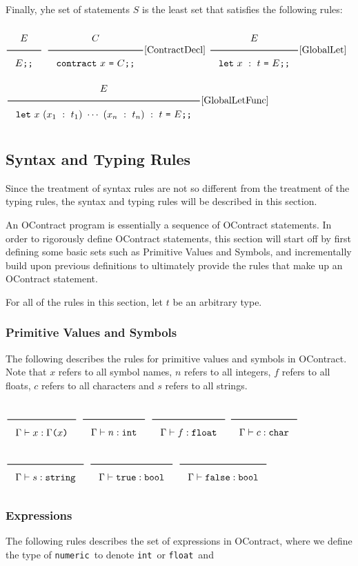 \documentclass[a4paper]{article}
\newcommand{\Rule}[2]{\genfrac{}{}{0.7pt}{}{{\setlength{\fboxrule}{0pt}\setlength{\fboxsep}{3mm}\fbox{$#1$}}}{{\setlength{\fboxrule}{0pt}\setlength{\fboxsep}{3mm}\fbox{$#2$}}}}
\newcommand{\RuleWithName}[3]{\genfrac{}{}{0.7pt}{}{{\setlength{\fboxrule}{0pt}\setlength{\fboxsep}{3mm}\fbox{$#1$}}}{{\setlength{\fboxrule}{0pt}\setlength{\fboxsep}{3mm}\fbox{$#2$}}}[\text{#3}]}
\newcommand{\TruE}{\texttt{true}}
\newcommand{\FalsE}{\texttt{false}}
\newcommand{\Int}{\texttt{int}}
\newcommand{\Float}{\texttt{float}}
\newcommand{\String}{\texttt{string}}
\newcommand{\Char}{\texttt{char}}
\newcommand{\Num}{\texttt{numeric}}
\newcommand{\Bool}{\texttt{bool}}
\newcommand{\Rp}{\texttt{)}}
\newcommand{\Lp}{\texttt{(}}
\begin{document}
Finally, yhe set of statements $S$ is the least set that satisfies the following rules:

$\Rule{E}{E\texttt{;;}}$
\hfill
$\RuleWithName{C}{\texttt{contract}\ x\ \texttt{=}\ C\texttt{;;}}{ContractDecl}$
\hfill
$\RuleWithName{E}{\texttt{let}\ x\ :\ t\ \texttt{=}\ E\texttt{;;}}{GlobalLet}$
\hfill
$\RuleWithName{E}{\texttt{let}\ x\ (x_1\ :\ t_1)\ \cdots\ (x_n\ :\ t_n)\ :\ t\ \texttt{=}\ E\texttt{;;}}{GlobalLetFunc}$


\subsection{Syntax and Typing Rules}
Since the treatment of syntax rules are not so different from the treatment of the typing rules, the syntax and typing rules will be described in this section.

An OContract program is essentially a sequence of OContract statements. In order to rigorously define OContract statements,
this section will start off by first defining some basic sets such as Primitive Values and Symbols, and incrementally build upon
previous definitions to ultimately provide the rules that make up an OContract statement.

For all of the rules in this section, let $t$ be an arbitrary type.

\subsubsection{Primitive Values and Symbols}

The following describes the rules for primitive values and symbols in OContract.
Note that $x$ refers to all symbol names, $n$ refers to all integers, $f$ refers to all floats,
$c$ refers to all characters and $s$ refers to all strings.

$\Rule{}{\Gamma \vdash x : \Gamma \Lp x \Rp}$
\hfill
$\Rule{}{\Gamma \vdash n : \Int}$
\hfill
$\Rule{}{\Gamma \vdash f : \Float}$
\hfill
$\Rule{}{\Gamma \vdash c : \Char}$
\hfill
$\Rule{}{\Gamma \vdash s : \String}$
\hfill
$\Rule{}{\Gamma \vdash \TruE : \Bool}$
\hfill
$\Rule{}{\Gamma \vdash \FalsE : \Bool}$

\subsubsection{Expressions}

The following rules describes the set of expressions in OContract,
where we define the type of \Num\ to denote \Int\ or \Float\ and
\end{document}
